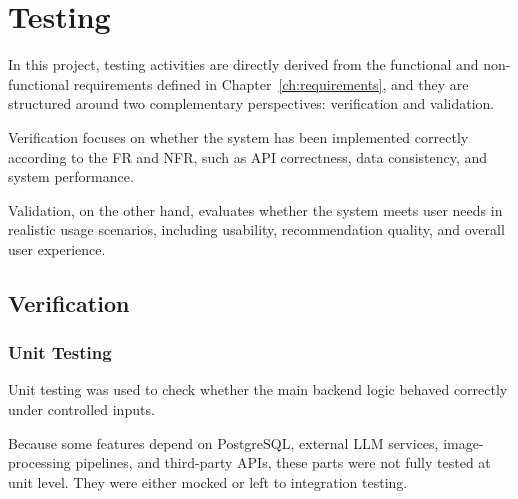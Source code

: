 \chapter{Testing}
\label{ch:testing}
In this project, testing activities are directly derived from the functional and non-functional requirements defined in Chapter~\ref{ch:requirements}, and they are structured around two complementary perspectives: 
verification and validation. 

Verification focuses on whether the system has been implemented correctly 
according to the FR and NFR, such as API correctness, data consistency, and system performance. 

Validation, on the other hand, evaluates whether the system meets user needs 
in realistic usage scenarios, including usability, recommendation quality, and 
overall user experience.

\section{Verification}

\subsection{Unit Testing}
Unit testing was used to check whether the main backend logic behaved correctly under controlled inputs.

Because some features depend on PostgreSQL, external LLM services, image-processing pipelines, and third-party APIs, these parts were not fully tested at unit level. They were either mocked or left to integration testing.

